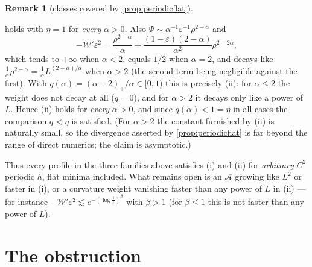 \documentclass[11pt]{article}
\theoremstyle{definition}
\newtheorem{remark}[theorem]{Remark}
\begin{document}
\begin{remark}[classes covered by \cref{prop:periodicflat}]
\begin{itemize}
holds with $\eta=1$ for \emph{every} $\alpha>0$.  Also
$\Psi\sim\alpha^{-1}\varepsilon^{-1}\rho^{2-\alpha}$ and
\begin{equation}
-\mathcal W'\varepsilon^2=\frac{\rho^{2-\alpha}}{\alpha}
+\frac{(1-\varepsilon)(2-\alpha)}{\alpha^2}\rho^{2-2\alpha},
\end{equation}
which tends to $+\infty$ when $\alpha<2$, equals $1/2$ when $\alpha=2$, and
decays like $\frac1\alpha\rho^{2-\alpha}=\frac1\alpha
L^{(2-\alpha)/\alpha}$ when $\alpha>2$ (the second term being negligible
against the first).  With $q(\alpha)=(\alpha-2)_+/\alpha\in[0,1)$ this is
precisely (ii): for $\alpha\le2$ the weight does not decay at all ($q=0$),
and for $\alpha>2$ it decays only like a power of $L$.  Hence (ii) holds for
\emph{every} $\alpha>0$, and since $q(\alpha)<1=\eta$ in all cases the
comparison $q<\eta$ is satisfied.  (For $\alpha>2$ the constant furnished by
(ii) is naturally small, so the divergence asserted by
\cref{prop:periodicflat} is far beyond the range of direct numerics; the claim
is asymptotic.)
\end{itemize}
Thus every profile in the three families above satisfies (i) and (ii) for
\emph{arbitrary} $C^2$ periodic $h$, flat minima included.  What remains open
is an $\mathcal A$ growing like $L^2$ or faster in (i), or a curvature weight
vanishing faster than any power of $L$ in (ii) --- for instance
$-\mathcal W'\varepsilon^2\lesssim e^{-(\log\frac1\varepsilon)^\beta}$ with
$\beta>1$ (for $\beta\le1$ this is not faster than any power of $L$).
\end{remark}
\section{The obstruction}\label{sec:obstruction}
\end{document}
